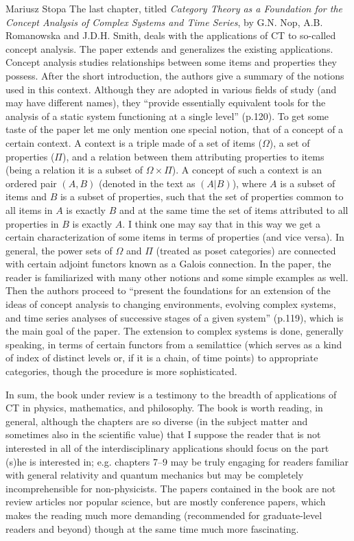 \begin{recengenv}{Mariusz Stopa}
\enlargethispage{-.5\baselineskip}
The last chapter, titled \textit{Category Theory as a Foundation for the Concept Analysis of Complex Systems and Time Series}, by G.N. Nop, A.B. Romanowska and J.D.H. Smith, deals with the applications of CT to so-called concept analysis. The paper extends and generalizes the existing applications. Concept analysis studies relationships between some items and properties they possess. After the short introduction, the authors give a summary of the notions used in this context. Although they are adopted in various fields of study (and may have different names), they ``provide essentially equivalent tools for the analysis of a static system functioning at a single level'' (p.120). To get some taste of the paper let me only mention one special notion, that of a concept of a certain context. A context is a triple made of a set of items ($ \Omega $), a set of properties ($ \Pi $), and a relation between them attributing properties to items (being a relation it is a subset of $ \Omega\times\Pi $). A concept of such a context is an ordered pair $ (A, B) $ (denoted in the text as $ (A|B) $), where $ A $ is a subset of items and $ B $ is a subset of properties, such that the set of properties common to all items in $ A $ is exactly $ B $ and at the same time the set of items attributed to all properties in $ B $ is exactly $ A $. I think one may say that in this way we get a certain characterization of some items in terms of properties (and vice versa). In general, the power sets of $ \Omega $ and $ \Pi $ (treated as poset cat\-e\-gories) are connected with certain adjoint functors known as a Galois connection. In the paper, the reader is familiarized with many other notions and some simple examples as well. Then the authors proceed to ``present the foundations for an extension of the ideas of concept analysis to changing environments, evolving complex systems, and time series analyses of successive stages of a given system'' (p.119), which is the main goal of the paper. The extension to complex systems is done, generally speaking, in terms of certain functors from a semilattice (which serves as a kind of index of distinct levels or, if it is a chain, of time points) to appropriate cat\-e\-gories, though the procedure is more sophisticated.

In sum, the book under review is a testimony to the breadth of applications of CT in physics, mathematics, and philosophy. The book is worth reading, in general, although the chapters are so diverse (in the subject matter and sometimes also in the scientific value) that I suppose the reader that is not interested in all of the interdisciplinary applications should focus on the part (s)he is interested in; e.g. chapters 7--9 may be truly engaging for readers familiar with general relativity and quantum mechanics but may be completely incomprehensible for non-physicists. The papers contained in the book are not review articles nor popular science, but are mostly conference papers, which makes the reading much more demanding (recommended for graduate-level readers and beyond) though at the same time much more fascinating.


\end{recengenv}
